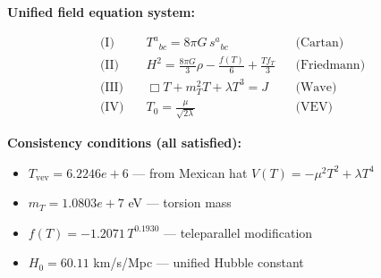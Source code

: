 
\textbf{Unified field equation system:}

\begin{align}
  \text{(I)} \quad & T^a{}_{bc} = 8\pi G \, s^a{}_{bc} && \text{(Cartan)} \\
  \text{(II)} \quad & H^2 = \frac{8\pi G}{3}\rho - \frac{f(T)}{6} + \frac{Tf_T}{3} && \text{(Friedmann)} \\
  \text{(III)} \quad & \Box T + m_T^2 T + \lambda T^3 = J && \text{(Wave)} \\
  \text{(IV)} \quad & T_0 = \frac{\mu}{\sqrt{2\lambda}} && \text{(VEV)}
\end{align}

\textbf{Consistency conditions (all satisfied):}
\begin{itemize}
  \item $T_{\text{vev}} = 6.2246e+6$ — from Mexican hat $V(T) = -\mu^2 T^2 + \lambda T^4$
  \item $m_T = 1.0803e+7$ eV — torsion mass
  \item $f(T) = -1.2071 \, T^{0.1930}$ — teleparallel modification
  \item $H_0 = 60.11$ km/s/Mpc — unified Hubble constant
\end{itemize}